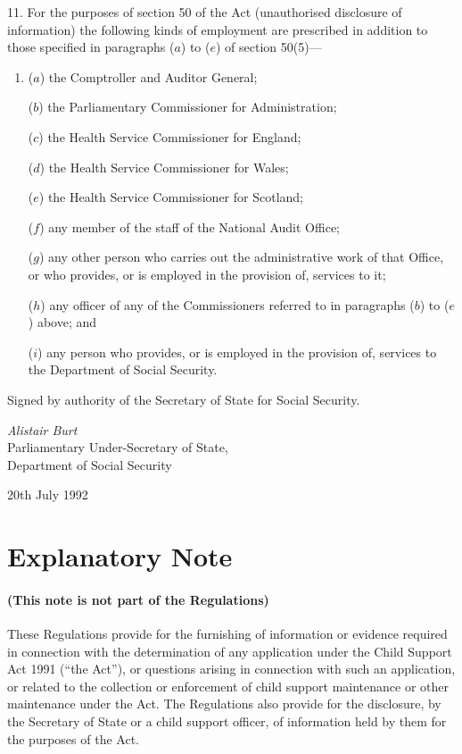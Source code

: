 \documentclass[a4paper]{article}
\newcommand{\parthead}{}
\begin{document}
11.  For the purposes of section 50 of the Act (unauthorised disclosure of information) the following kinds of employment are prescribed in addition to those specified in paragraphs ($a$) to ($e$) of section 50(5)—
\begin{enumerate}\item[]
($a$) the Comptroller and Auditor General;

($b$) the Parliamentary Commissioner for Administration;

($c$) the Health Service Commissioner for England;

($d$) the Health Service Commissioner for Wales;

($e$) the Health Service Commissioner for Scotland;

($f$) any member of the staff of the National Audit Office;

($g$) any other person who carries out the administrative work of that Office, or who provides, or is employed in the provision of, services to it;

($h$) any officer of any of the Commissioners referred to in paragraphs ($b$) to ($e$) above; and

($i$) any person who provides, or is employed in the provision of, services to the Department of Social Security.
\end{enumerate}

\bigskip

Signed by authority of the Secretary of State for Social Security.

{\raggedleft
\emph{Alistair Burt}\\Parliamentary Under-Secretary of State,\\Department of Social Security

}

20th July 1992

\part{Explanatory Note}

\renewcommand\parthead{--- Explanatory Note}

\subsection*{(This note is not part of the Regulations)}

 These Regulations provide for the furnishing of information or evidence required in connection with the determination of any application under the Child Support Act 1991 (“the Act”), or questions arising in connection with such an application, or related to the collection or enforcement of child support maintenance or other maintenance under the Act. The Regulations also provide for the disclosure, by the Secretary of State or a child support officer, of information held by them for the purposes of the Act.
\end{document}

